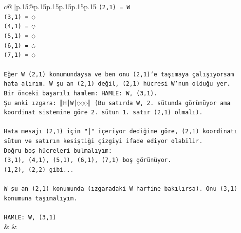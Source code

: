 \documentclass{article}
\begin{document}
{\begin{supertabular}{c@{$\;$}|p{.15\linewidth}@{}p{.15\linewidth}p{.15\linewidth}p{.15\linewidth}p{.15\linewidth}p{.15\linewidth}}
{{{\texttt{(2,1) = W} \\
\texttt{(3,1) = ◌} \\
\texttt{(4,1) = ◌} \\
\texttt{(5,1) = ◌} \\
\texttt{(6,1) = ◌} \\
\texttt{(7,1) = ◌} \\
\\ 
\texttt{Eğer W (2,1) konumundaysa ve ben onu (2,1)'e taşımaya çalışıyorsam hata alırım. W şu an (2,1) değil, (2,1) hücresi W'nun olduğu yer. } \\
\texttt{Bir önceki başarılı hamlem: HAMLE: W, (3,1). } \\
\texttt{Şu anki ızgara: ║H│W│◌◌◌║ (Bu satırda W, 2. sütunda görünüyor ama koordinat sistemine göre 2. sütun 1. satır (2,1) olmalı).} \\
\\ 
\texttt{Hata mesajı (2,1) için "│" içeriyor dediğine göre, (2,1) koordinatı sütun ve satırın kesiştiği çizgiyi ifade ediyor olabilir. } \\
\texttt{Doğru boş hücreleri bulmalıyım:} \\
\texttt{(3,1), (4,1), (5,1), (6,1), (7,1) boş görünüyor.} \\
\texttt{(1,2), (2,2) gibi...} \\
\\ 
\texttt{W şu an (2,1) konumunda (ızgaradaki W harfine bakılırsa). Onu (3,1) konumuna taşımalıyım.} \\
\\ 
\texttt{HAMLE: W, (3,1)} \\
            }
        }
    }
    & & \\ \\


\end{supertabular}}
\end{document}
